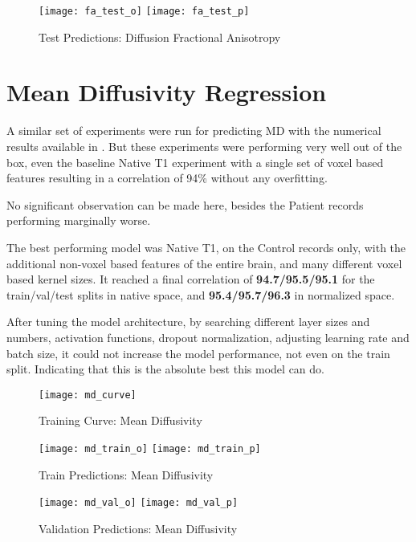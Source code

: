 \begin{figure}[H]
\centering
\texttt{[image: fa\_test\_o]}
\texttt{[image: fa\_test\_p]}
\caption{Test Predictions: Diffusion Fractional Anisotropy}
\label{fig:pred-tes-fa}
\end{figure}

\section{Mean Diffusivity Regression}

A similar set of experiments were run for predicting \ac{MD} with the numerical results available in  . But these experiments were performing very well out of the box, even the baseline Native T1 experiment with a single set of voxel based features resulting in a correlation of 94\% without any overfitting.\par
No significant observation can be made here, besides the Patient records performing marginally worse.\par
The best performing model was Native T1, on the Control records only, with the additional non-voxel based features of the entire brain, and many different voxel based kernel sizes. It reached a final correlation of \textbf{94.7/95.5/95.1} for the train/val/test splits in native space, and \textbf{95.4/95.7/96.3} in normalized space.\par
After tuning the model architecture, by searching different layer sizes and numbers, activation functions, dropout normalization, adjusting learning rate and batch size, it could not increase the model performance, not even on the train split. Indicating that this is the absolute best this model can do.

\begin{figure}[H]
\centering
\texttt{[image: md\_curve]}
\caption{Training Curve: Mean Diffusivity}
\label{fig:curve-md}
\end{figure}

\begin{figure}[H]
\centering
\texttt{[image: md\_train\_o]}
\texttt{[image: md\_train\_p]}
\caption{Train Predictions: Mean Diffusivity}
\label{fig:pred-tra-md}
\end{figure}

\begin{figure}[H]
\centering
\texttt{[image: md\_val\_o]}
\texttt{[image: md\_val\_p]}
\caption{Validation Predictions: Mean Diffusivity}
\label{fig:pred-val-md}
\end{figure}

